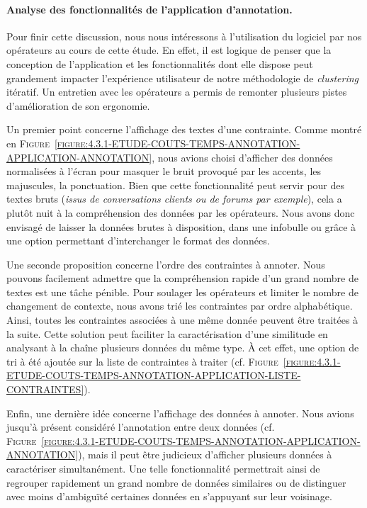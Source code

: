 		\paragraph{Analyse des fonctionnalités de l'application d'annotation.}
		
			Pour finir cette discussion, nous nous intéressons à l'utilisation du logiciel par nos opérateurs au cours de cette étude.
			En effet, il est logique de penser que la conception de l'application et les fonctionnalités dont elle dispose peut grandement impacter l'expérience utilisateur de notre méthodologie de \textit{clustering} itératif.
			Un entretien avec les opérateurs a permis de remonter plusieurs pistes d'amélioration de son ergonomie.
			
			Un premier point concerne l'affichage des textes d'une contrainte.
			Comme montré en \textsc{Figure~\ref{figure:4.3.1-ETUDE-COUTS-TEMPS-ANNOTATION-APPLICATION-ANNOTATION}}, nous avions choisi d'afficher des données normalisées à l'écran pour masquer le bruit provoqué par les accents, les majuscules, la ponctuation.
			Bien que cette fonctionnalité peut servir pour des textes bruts (\textit{issus de conversations clients ou de forums par exemple}), cela a plutôt nuit à la compréhension des données par les opérateurs.
			Nous avons donc envisagé de laisser la données brutes à disposition, dans une infobulle ou grâce à une option permettant d'interchanger le format des données.
			
			Une seconde proposition concerne l'ordre des contraintes à annoter.
			Nous pouvons facilement admettre que la compréhension rapide d'un grand nombre de textes est une tâche pénible.
			Pour soulager les opérateurs et limiter le nombre de changement de contexte, nous avons trié les contraintes par ordre alphabétique.
			Ainsi, toutes les contraintes associées à une même donnée peuvent être traitées à la suite.
			Cette solution peut faciliter la caractérisation d'une similitude en analysant à la chaîne plusieurs données du même type.
			À cet effet, une option de tri à été ajoutée sur la liste de contraintes à traiter (cf. \textsc{Figure~\ref{figure:4.3.1-ETUDE-COUTS-TEMPS-ANNOTATION-APPLICATION-LISTE-CONTRAINTES}}).
			
			Enfin, une dernière idée concerne l'affichage des données à annoter.
			Nous avions jusqu'à présent considéré l'annotation entre deux données (cf. \textsc{Figure~\ref{figure:4.3.1-ETUDE-COUTS-TEMPS-ANNOTATION-APPLICATION-ANNOTATION}}), mais il peut être judicieux d'afficher plusieurs données à caractériser simultanément.
			Une telle fonctionnalité permettrait ainsi de regrouper rapidement un grand nombre de données similaires ou de distinguer avec moins d'ambiguïté certaines données en s'appuyant sur leur voisinage.
			
